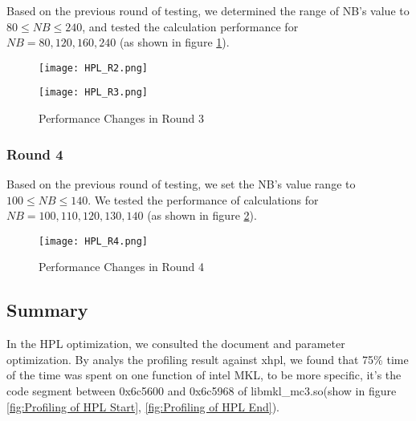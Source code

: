 \documentclass{mcmthesis}
\begin{document}
\par Based on the previous round of testing, we determined the range of NB's value to $80 \leqslant NB \leqslant 240$, and tested the calculation performance for $NB = 80, 120, 160, 240$ (as shown in figure \ref{fig:Performance Changes r3}).



\begin{figure}[htbp]  
\begin{minipage}[t]{0.5\textwidth}
\centering  
\texttt{[image: HPL\_R2.png]} \\
\caption{Performance Changes in Round 2} \label{fig:Performance Changes r2}
\end{minipage}
\hspace{1ex}
\begin{minipage}[t]{0.5\textwidth}  
\centering  
\texttt{[image: HPL\_R3.png]}\\
\caption{Performance Changes in Round 3}  \label{fig:Performance Changes r3}
\end{minipage}  
\end{figure} 


\subsubsection{Round 4}

\par Based on the previous round of testing, we set the NB's value range to $100 \leqslant NB \leqslant 140$. We tested the performance of calculations for $NB = 100,110, 120,130,140$ (as shown in figure \ref{fig:Performance Changes in Round 4}).

\begin{figure}[!h]
\small
\centering
\texttt{[image: HPL\_R4.png]}
\caption{Performance Changes in Round 4}
\label{fig:Performance Changes in Round 4}
\end{figure}


\subsection{Summary}

\par In the HPL optimization, we consulted the document and parameter optimization. By analys the profiling result against xhpl, we found that 75\% time of the time was spent on one function of intel MKL, to be more specific, it's the code segment between 0x6c5600 and 0x6c5968 of libmkl\_mc3.so(show in figure \ref{fig:Profiling of HPL Start}, \ref{fig:Profiling of HPL End}).
\end{document}
